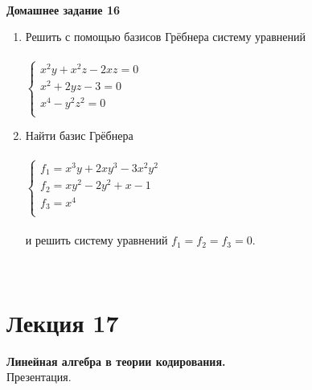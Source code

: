\documentclass[12pt]{article}
\theoremstyle{definition}
\numberwithin{equation}{section}
\begin{document}
	\\
	\textbf{Домашнее задание 16}\begin{enumerate}
		\item Решить с помощью базисов Грёбнера систему уравнений\\ \\
		$
		\left\{
		\begin{array}{lcl}
		x^2y+x^2z-2xz=0\\
		x^2+2yz-3=0\\
		x^4-y^2z^2=0\\
		\end{array}
		\right.
		$
		\item Найти базис Грёбнера\\ \\
		$
		\left\{
		\begin{array}{lcl}
		f_1=x^3y+2xy^3-3x^2y^2\\
		f_2=xy^2-2y^2+x-1\\
		f_3=x^4\\
		\end{array}
		\right.
		$
		\\ \\и решить систему уравнений $f_1=f_2=f_3=0$.
	\end{enumerate}
	~\\
	\section *{Лекция 17}
	\noindent\textbf{Линейная алгебра в теории кодирования.}\\
	Презентация.\\
\end{document}
